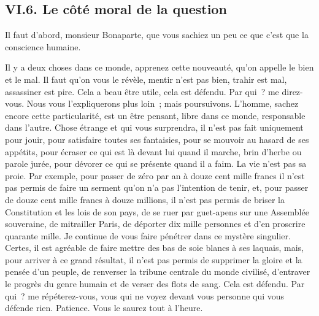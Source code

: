 \documentclass[french,twoside]{book} %
\begin{document}
\subsection[{VI.6. Le côté moral de la question}]{VI.6. Le côté moral de la question}
\noindent Il faut d’abord, monsieur Bonaparte, que vous sachiez un peu ce que c’est que la conscience humaine.\par
Il y a deux choses dans ce monde, apprenez cette nouveauté, qu’on appelle le bien et le mal. Il faut qu’on vous le révèle, mentir n’est pas bien, trahir est mal, assassiner est pire. Cela a beau être utile, cela est défendu. Par qui ? me direz-vous. Nous vous l’expliquerons plus loin ; mais poursuivons. L’homme, sachez encore cette particularité, est un être pensant, libre dans ce monde, responsable dans l’autre. Chose étrange et qui vous surprendra, il n’est pas fait uniquement pour jouir, pour satisfaire toutes ses fantaisies, pour se mouvoir au hasard de ses appétits, pour écraser ce qui est là devant lui quand il marche, brin d’herbe ou parole jurée, pour dévorer ce qui se présente quand il a faim. La vie n’est pas sa proie. Par exemple, pour passer de zéro par an à douze cent mille francs il n’est pas permis de faire un serment qu’on n’a pas l’intention de tenir, et, pour passer de douze cent mille francs à douze millions, il n’est pas permis de briser la Constitution et les lois de son pays, de se ruer par guet-apens sur une Assemblée souveraine, de mitrailler Paris, de déporter dix mille personnes et d’en proscrire quarante mille. Je continue de vous faire pénétrer dans ce mystère singulier. Certes, il est agréable de faire mettre des bas de soie blancs à ses laquais, mais, pour arriver à ce grand résultat, il n’est pas permis de supprimer la gloire et la pensée d’un peuple, de renverser la tribune centrale du monde civilisé, d’entraver le progrès du genre humain et de verser des flots de sang. Cela est défendu. Par qui ? me répéterez-vous, vous qui ne voyez devant vous personne qui vous défende rien. Patience. Vous le saurez tout à l’heure.\par
\end{document}
